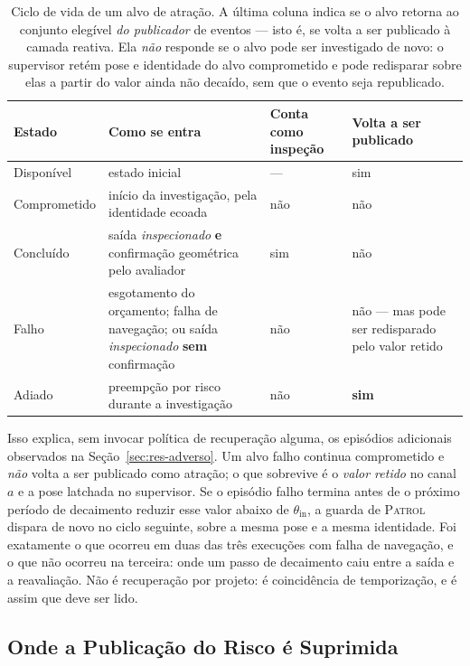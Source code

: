 \begin{table}[htb]
\centering
\caption{Ciclo de vida de um alvo de atração. A última coluna indica se o alvo retorna
ao conjunto elegível \emph{do publicador} de eventos --- isto é, se volta a ser
publicado à camada reativa. Ela \emph{não} responde se o alvo pode ser investigado de
novo: o supervisor retém pose e identidade do alvo comprometido e pode redisparar sobre
elas a partir do valor ainda não decaído, sem que o evento seja republicado.}
\label{tab:prop-ciclo}
\footnotesize
\begin{tabular}{p{}p{}p{}p{}}
\hline
\textbf{Estado} & \textbf{Como se entra} & \textbf{Conta como inspeção} &
\textbf{Volta a ser publicado}\\
\hline
Disponível & estado inicial & --- & sim\\
\hline
Comprometido & início da investigação, pela identidade ecoada & não & não\\
\hline
Concluído & saída \emph{inspecionado} \textbf{e} confirmação geométrica pelo avaliador
& sim & não\\
\hline
Falho & esgotamento do orçamento; falha de navegação; ou saída \emph{inspecionado}
\textbf{sem} confirmação & não & não --- mas pode ser redisparado pelo valor retido\\
\hline
Adiado & preempção por risco durante a investigação & não & \textbf{sim}\\
\hline
\end{tabular}
\end{table}

Isso explica, sem invocar política de recuperação alguma, os episódios adicionais
observados na Seção~\ref{sec:res-adverso}. Um alvo falho continua comprometido e
\emph{não} volta a ser publicado como atração; o que sobrevive é o \emph{valor retido}
no canal $a$ e a pose latchada no supervisor. Se o episódio falho termina antes de o
próximo período de decaimento reduzir esse valor abaixo de $\theta_{\text{in}}$, a
guarda de \textsc{Patrol} dispara de novo no ciclo seguinte, sobre a mesma pose e a
mesma identidade. Foi exatamente o que ocorreu em duas das três execuções com falha de
navegação, e o que não ocorreu na terceira: onde um passo de decaimento caiu entre a
saída e a reavaliação. Não é recuperação por projeto: é coincidência de temporização, e
é assim que deve ser lido.

\subsection{Onde a Publicação do Risco é Suprimida}

